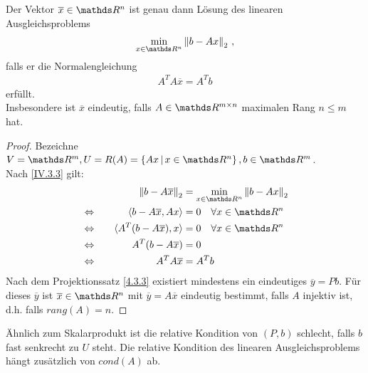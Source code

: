 \begin{Satze}
  Der Vektor $\overline{x} \in\R^n$ ist genau dann Lösung des linearen Ausgleichsproblems
  \begin{gather*}
    \min_{x\in\Ren} \nn{b-Ax}_2 \, ,
  \end{gather*}
  falls er die Normalengleichung
  \begin{gather}
    A^TA\overline{x} = A^Tb
    \label{IV.3.6}
  \end{gather}
  erfüllt. \\
  Insbesondere ist $\overline{x}$ eindeutig,
  falls $A\in \R^{m\times n}$ maximalen Rang $n\leq m$ hat.
\end{Satze}

\begin{proof} Bezeichne
  $V= \R^m, U= R(A) = \left\{Ax \, \middle|  \, x \in\Ren \right\}, b \in \R^m$.\\
  Nach \eqref{IV.3.3} gilt:
  \begin{alignat*}{2}
    &&\nn{b-A\overline{x}}_2 &= \min_{x\in\Ren} \nn{b-Ax}_2 \\
    &\Leftrightarrow \quad & \scp{b-A \overline{x}}{Ax} &= 0 \quad \forall x\in \Ren \\
    &\Leftrightarrow & \scp{A^T(b-A\overline{x})}{x} &= 0 \quad  \forall x\in\Ren \\
    &\Leftrightarrow & A^T(b-A\overline{x}) &= 0 \\
    &\Leftrightarrow & A^TA\overline{x} &= A^Tb
  \end{alignat*}
  Nach dem Projektionssatz \ref{4.3.3} existiert mindestens ein eindeutiges
  $\overline{y} = P b$.
  Für dieses $\overline{y}$ ist $\overline{x}\in \Ren $ mit $\overline{y} = A\overline{x}$
  eindeutig bestimmt, falls $A$ injektiv ist, d.h. falls $rang(A) = n$. 
\end{proof}

Ähnlich zum Skalarprodukt ist die relative Kondition von $(P,b) $ schlecht, 
falls $b$ fast senkrecht zu $U$ steht.
Die relative Kondition des linearen Ausgleichsproblems hängt zusätzlich von $cond(A)$ ab.


